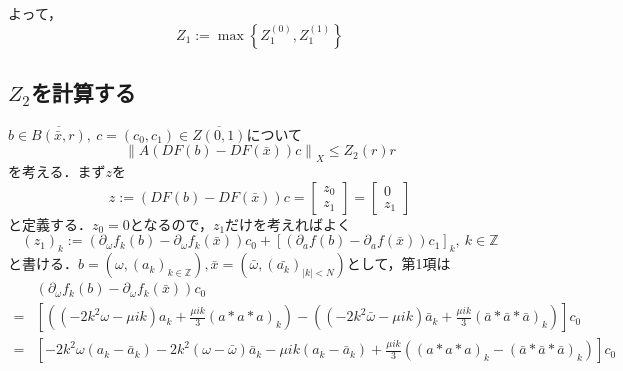 \documentclass[11pt,a4paper,titlepage]{jsreport}
\theoremstyle{definition}
\begin{document}
よって，
\begin{equation*}
  Z_1 := \max \left\{ Z_1^{(0)}, Z_1^{(1)} \right\}
\end{equation*}

\subsection{$Z_2$を計算する}
$b \in \overline{B\left(\bar{x},r\right)},\ c=\left(c_0,c_1\right)\in\overline{Z(0,1)}$について
\begin{equation*}
  \left\| A \left( DF \left( b \right) - DF \left( \bar{x} \right) \right) c \right\|_X \leq Z_2(r)r
\end{equation*}
を考える．まず$z$を
\begin{equation*}
  z := \left( DF(b) - DF(\bar{x}) \right) c = \begin{bmatrix}
    z_0 \\
    z_1
  \end{bmatrix}
  = \begin{bmatrix}
    0 \\
    z_1
  \end{bmatrix}
\end{equation*}
と定義する．$z_0=0$となるので，$z_1$だけを考えればよく
\begin{equation*}
  \left(z_1\right)_k := \left(\partial_\omega f_k \left(b\right) - \partial_\omega f_k \left(\bar{x}\right) \right)c_0 + \left[ \left(\partial_a f\left(b\right) - \partial_a f \left(\bar{x}\right) \right) c_1 \right]_k,\ k \in \mathbb{Z}
\end{equation*}
と書ける．$b=\left( \omega, \left(a_k\right)_{k\in\mathbb{Z}} \right), \bar{x}=\left( \bar{\omega}, \left(\bar{a_k}\right)_{|k|<N} \right)$として，第1項は
\begin{equation*}
  \begin{split}
    &\left(\partial_\omega f_k \left(b\right) - \partial_\omega f_k \left(\bar{x}\right) \right)c_0 \\
    =& \left[ \left( \left( -2k^2\omega - \mu ik \right) a_k + \frac{\mu ik}{3} \left( a*a*a \right)_k \right) - \left( \left( -2k^2\bar{\omega} - \mu ik \right) \bar{a}_k       + \frac{\mu ik}{3} \left( \bar{a}*\bar{a}*\bar{a} \right)_k \right) \right]c_0 \\
    =& \left[  -2k^2\omega \left( a_k - \bar{a}_k \right) -2k^2\left( \omega - \bar{\omega} \right)\bar{a}_k - \mu ik \left( a_k - \bar{a}_k \right) + \frac{\mu ik}{3} \left( \left( a*a*a \right)_k - \left(\bar{a}*\bar{a}*\bar{a}\right)_k \right) \right] c_0
  \end{split}
\end{equation*}
\end{document}
